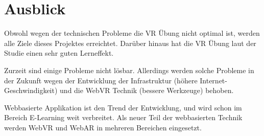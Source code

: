 \section{Ausblick}

Obwohl wegen der technischen Probleme die VR Übung nicht optimal ist, werden alle Ziele dieses Projektes erreichtet. Darüber hinaus hat die VR Übung laut der Studie einen sehr guten Lerneffekt.

Zurzeit sind einige Probleme nicht lösbar. Allerdings werden solche Probleme in der Zukunft wegen der Entwicklung der Infrastruktur (höhere Internet-Geschwindigkeit) und die WebVR Technik (bessere Werkzeuge) behoben.

Webbasierte Applikation ist den Trend der Entwicklung, und wird schon im Bereich E-Learning weit verbreitet. Als neuer Teil der webbasierten Technik werden WebVR und WebAR in mehreren Bereichen eingesetzt.


